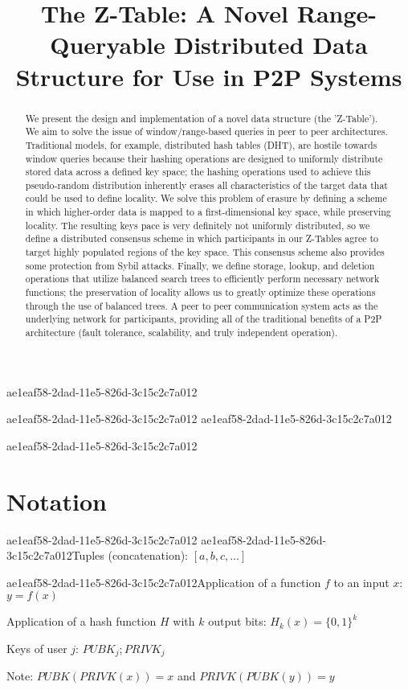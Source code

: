 \documentclass[12pt]{article}
\title{The Z-Table: A Novel Range-Queryable Distributed Data Structure for Use in P2P Systems}
\begin{document}
ae1eaf58-2dad-11e5-826d-3c15c2c7a012
\maketitle
ae1eaf58-2dad-11e5-826d-3c15c2c7a012
ae1eaf58-2dad-11e5-826d-3c15c2c7a012\begin{abstract}
We present the design and implementation of a novel data structure (the 'Z-Table'). We aim to solve the issue of window/range-based queries in peer to peer architectures. Traditional models, for example,  distributed hash tables (DHT), are hostile towards window queries because their hashing operations are designed to uniformly distribute stored data across a defined key space; the hashing operations used to achieve this pseudo-random distribution inherently erases all characteristics of the target data that could be used to define locality. We solve this problem of erasure by defining a scheme in which higher-order data is mapped to a first-dimensional key space, while preserving locality. The resulting keys pace is very definitely not uniformly distributed, so we define a distributed consensus scheme in which participants in our Z-Tables agree to target highly populated regions of the key space. This consensus scheme also provides some protection from Sybil attacks. Finally, we define storage, lookup, and deletion operations that utilize balanced search trees to efficiently perform necessary network functions; the preservation of locality allows us to greatly optimize these operations through the use of balanced trees. A peer to peer communication system acts as the underlying network for participants, providing all of the traditional benefits of a P2P architecture (fault tolerance, scalability, and truly independent operation).
\end{abstract}

ae1eaf58-2dad-11e5-826d-3c15c2c7a012\section{Notation}
ae1eaf58-2dad-11e5-826d-3c15c2c7a012
ae1eaf58-2dad-11e5-826d-3c15c2c7a012Tuples (concatenation): $[a,b,c,...]$

ae1eaf58-2dad-11e5-826d-3c15c2c7a012Application of a function $f$ to an input $x$: $y=f(x)$

Application of a hash function $H$ with $k$ output bits: $H_{k}(x) = \{0,1\}^k$

Keys of user $j$: $ PUBK_j; PRIVK_j $

Note: $PUBK(PRIVK(x)) = x$ and $PRIVK(PUBK(y)) = y$~
\end{document}
